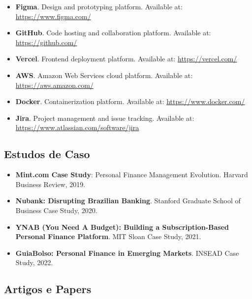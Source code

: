 \begin{itemize}
    \item \textbf{Figma}. Design and prototyping platform. Available at: \url{https://www.figma.com/}
    
    \item \textbf{GitHub}. Code hosting and collaboration platform. Available at: \url{https://github.com/}
    
    \item \textbf{Vercel}. Frontend deployment platform. Available at: \url{https://vercel.com/}
    
    \item \textbf{AWS}. Amazon Web Services cloud platform. Available at: \url{https://aws.amazon.com/}
    
    \item \textbf{Docker}. Containerization platform. Available at: \url{https://www.docker.com/}
    
    \item \textbf{Jira}. Project management and issue tracking. Available at: \url{https://www.atlassian.com/software/jira}
\end{itemize}

\subsection{Estudos de Caso}

\begin{itemize}
    \item \textbf{Mint.com Case Study}: Personal Finance Management Evolution. Harvard Business Review, 2019.
    
    \item \textbf{Nubank: Disrupting Brazilian Banking}. Stanford Graduate School of Business Case Study, 2020.
    
    \item \textbf{YNAB (You Need A Budget): Building a Subscription-Based Personal Finance Platform}. MIT Sloan Case Study, 2021.
    
    \item \textbf{GuiaBolso: Personal Finance in Emerging Markets}. INSEAD Case Study, 2022.
\end{itemize}

\subsection{Artigos e Papers}

